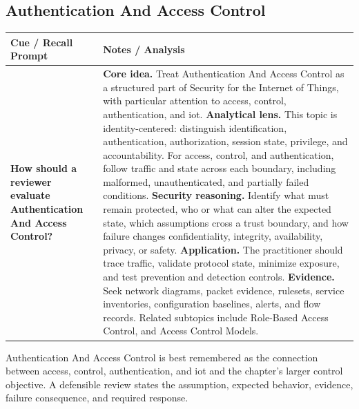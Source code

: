 \documentclass[11pt]{article}
\newcommand{\CornellHeader}{%
\rowcolor{Navy}\color{white}\bfseries Cue / Recall Prompt & \color{white}\bfseries Notes / Analysis\\\hline}
\newcommand{\CornellRow}[2]{%
\cellcolor{CueGray}\RaggedRight\textbf{#1} & \RaggedRight #2\\\hline}
\begin{document}
\subsection*{Authentication And Access Control}
\begin{longtable}{>{\RaggedRight\arraybackslash}p{}|>{\RaggedRight\arraybackslash}p{}}
\CornellHeader
\CornellRow{How should a reviewer evaluate Authentication And Access Control?}{\textbf{Core idea.} Treat Authentication And Access Control as a structured part of Security for the Internet of Things, with particular attention to access, control, authentication, and iot. \textbf{Analytical lens.} This topic is identity-centered: distinguish identification, authentication, authorization, session state, privilege, and accountability. For access, control, and authentication, follow traffic and state across each boundary, including malformed, unauthenticated, and partially failed conditions. \textbf{Security reasoning.} Identify what must remain protected, who or what can alter the expected state, which assumptions cross a trust boundary, and how failure changes confidentiality, integrity, availability, privacy, or safety. \textbf{Application.} The practitioner should trace traffic, validate protocol state, minimize exposure, and test prevention and detection controls. \textbf{Evidence.} Seek network diagrams, packet evidence, rulesets, service inventories, configuration baselines, alerts, and flow records. Related subtopics include Role-Based Access Control, and Access Control Models.}
\end{longtable}
\begin{topicsummary}
Authentication And Access Control is best remembered as the connection between access, control, authentication, and iot and the chapter's larger control objective. A defensible review states the assumption, expected behavior, evidence, failure consequence, and required response.
\end{topicsummary}
\end{document}
